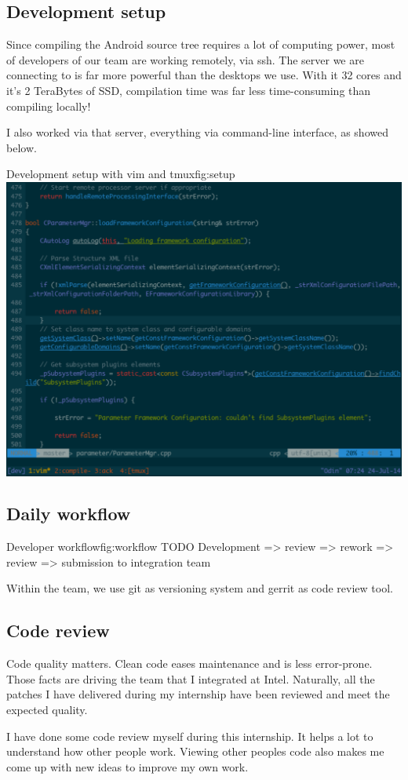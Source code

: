 \subsection{Development setup}
Since compiling the Android source tree requires a lot of computing power,
most of developers of our team are working remotely, via ssh.
The server we are connecting to is far more powerful than the desktops we use.
With it 32 cores and it's 2 TeraBytes of SSD, compilation time was far less time-consuming
than compiling locally!

I also worked via that server, everything via command-line interface, as showed below.
\begin{figureGraphics}{Development setup with vim and tmux}{fig:setup}
\includegraphics[width=\textwidth]{./src/img/setup.pdf}
\end{figureGraphics}

\subsection{Daily workflow}

\begin{figureGraphics}{Developer workflow}{fig:workflow}
    TODO
Development => review => rework => review => submission to integration team
\end{figureGraphics}

Within the team, we use \gls{git} as versioning system and \gls{gerrit} as code review tool.


\subsection{Code review}
Code quality matters. Clean code eases maintenance and is less error-prone.
Those facts are driving the team that I integrated at Intel. Naturally, all the
patches I have delivered during my internship have been reviewed and meet the
expected quality.

I have done some code review myself during this internship. It helps a lot to
understand how other people work. Viewing other peoples code also makes me come
up with new ideas to improve my own work.
